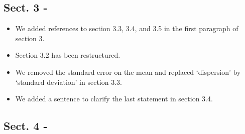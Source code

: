 \documentclass{article}
\begin{document}
\subsection*{Sect. 3 -}
\begin{itemize}
\item We added references to section 3.3, 3.4, and 3.5 in the first paragraph of section 3.
\item Section 3.2 has been restructured.
\item We removed the standard error on the mean and replaced `dispersion' 
by `standard deviation' in section 3.3.
\item We added a sentence to clarify the last statement in section 3.4.
\end{itemize}

\subsection*{Sect. 4 -}
\end{document}

